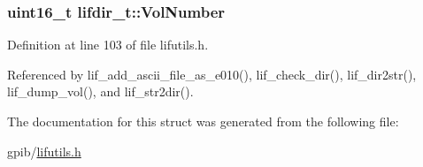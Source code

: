 \subsubsection[{\texorpdfstring{Vol\+Number}{VolNumber}}]{\setlength{\rightskip}{0pt plus 5cm}uint16\+\_\+t lifdir\+\_\+t\+::\+Vol\+Number}\hypertarget{structlifdir__t_a30c6a4231c58d2d43dc31e06bda5a687}{}\label{structlifdir__t_a30c6a4231c58d2d43dc31e06bda5a687}


Definition at line 103 of file lifutils.\+h.



Referenced by lif\+\_\+add\+\_\+ascii\+\_\+file\+\_\+as\+\_\+e010(), lif\+\_\+check\+\_\+dir(), lif\+\_\+dir2str(), lif\+\_\+dump\+\_\+vol(), and lif\+\_\+str2dir().



The documentation for this struct was generated from the following file\+:\begin{DoxyCompactItemize}
\item 
gpib/\hyperlink{lifutils_8h}{lifutils.\+h}\end{DoxyCompactItemize}

